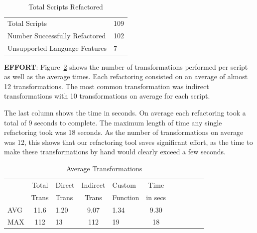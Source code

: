 \documentclass{sigplanconf}
\begin{document}
\begin{table}[htdp]
\begin{center}
\begin{tabular}{ll}
Total Scripts & 109 \\
Number Successfully Refactored & 102 \\
Unsupported Language Features & 7 \\
\end{tabular}
\nocaptionrule
\caption{Total Scripts Refactored}
\label{table:totalScripts}
\end{center}
\end{table}%

\textbf{EFFORT}:  
Figure~\ref{table:avgTrans} shows the number of transformations performed per script as well as the average times.
Each refactoring consisted on an average of almost 12 transformations.  The most common transformation was indirect transformations with 10  transformations on average for each script.

The last column shows the time in seconds.  On average each refactoring took a total of 9 seconds to complete.  The maximum length of time any single refactoring took was 18 seconds.  As the number of transformations on average was 12, this shows that our refactoring tool saves significant effort, as the time to make these transformations by hand would clearly exceed a few seconds.  
\begin{table}[htdp]
\begin{center}
\begin{tabular}{lclclclclcl}
 & Total & Direct & Indirect & Custom & Time \\
  & Trans & Trans & Trans & Function & in secs \\
  \hline
  \hline
AVG & 11.6 & 1.20 & 9.07 & 1.34 & 9.30 \\
\hline
MAX & 112 & 13 & 112 & 19 & 18 \\
\hline
\end{tabular}
\nocaptionrule
\caption{Average Transformations}
\end{center}
\label{table:avgTrans}
\end{table}%
\end{document}
